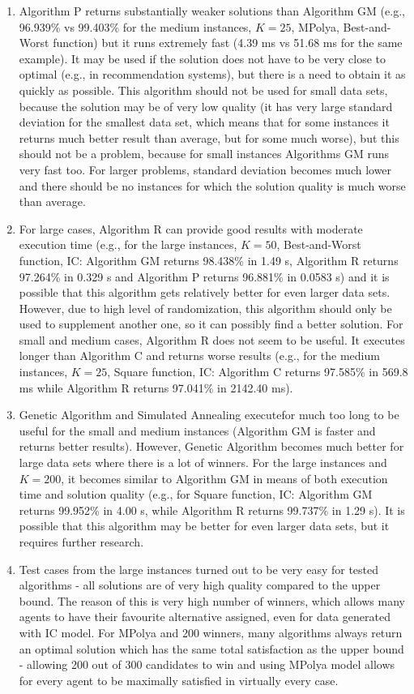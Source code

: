 \begin{enumerate}
	\item Algorithm P returns substantially weaker solutions than Algorithm GM (e.g., 96.939\% vs 99.403\% for the medium instances, $K = 25$, MPolya, Best-and-Worst function) but it runs extremely fast (4.39 ms vs 51.68 ms for the same example). It may be used if the solution does not have to be very close to optimal (e.g., in recommendation systems), but there is a need to obtain it as quickly as possible. This algorithm should not be used for small data sets, because the solution may be of very low quality (it has very large standard deviation for the smallest data set, which means that for some instances it returns much better result than average, but for some much worse), but this should not be a problem, because for small instances Algorithms GM runs very fast too. For larger problems, standard deviation becomes much lower and there should be no instances for which the solution quality is much worse than average.
	\item For large cases, Algorithm R can provide good results with moderate execution time (e.g., for the large instances, $K = 50$, Best-and-Worst function, IC: Algorithm GM returns 98.438\% in 1.49 s, Algorithm R returns 97.264\% in 0.329 s and Algorithm P returns 96.881\% in 0.0583 s) and it is possible that this algorithm gets relatively better for even larger data sets. However, due to high level of randomization, this algorithm should only be used to supplement another one, so it can possibly find a better solution. For small and medium cases, Algorithm R does not seem to be useful. It executes longer than Algorithm C and returns worse results (e.g., for the medium instances, $K = 25$, Square function, IC: Algorithm C returns 97.585\% in 569.8 ms while Algorithm R returns 97.041\% in 2142.40 ms).
    \item Genetic Algorithm and Simulated Annealing executefor  much too long to be useful for the small and medium instances (Algorithm GM is faster and returns better results). However, Genetic Algorithm becomes much better for large data sets where there is a lot of winners. For the large instances and $K = 200$, it becomes similar to Algorithm GM in means of both execution time and solution quality (e.g., for Square function, IC: Algorithm GM returns 99.952\% in 4.00 s, while Algorithm R returns 99.737\% in 1.29 s). It is possible that this algorithm may be better for even larger data sets, but it requires further research.
	\item Test cases from the large instances turned out to be very easy for tested algorithms - all solutions are of very high quality compared to the upper bound. The reason of this is very high number of winners, which allows many agents to have their favourite alternative assigned, even for data generated with IC model. For MPolya and 200 winners, many algorithms always return an optimal solution which has the same total satisfaction as the upper bound - allowing 200 out of 300 candidates to win and using MPolya model allows for every agent to be maximally satisfied in virtually every case.
\end{enumerate}

